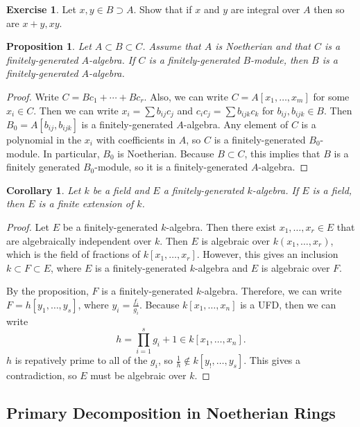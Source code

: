 \documentclass[leqno, openany]{memoir}
\newtheorem{cor}[thm]{Corollary}
\newtheorem{prop}[thm]{Proposition}
\theoremstyle{definition}
\newtheorem{exer}[thm]{Exercise}
\theoremstyle{remark}
\theoremstyle{plain}
\theoremstyle{definition}
\theoremstyle{remark}
\begin{document}
\begin{exer}
    Let $x,y \in B \supset A$. Show that if $x$ and $y$ are integral over $A$ then so are $x+y,xy$.
\end{exer}

\begin{prop}
    Let $A \subset B \subset C$. Assume that $A$ is Noetherian and that $C$ is a finitely-generated $A$-algebra. If $C$ is a finitely-generated $B$-module, then $B$ is a finitely-generated $A$-algebra.
\end{prop}

\begin{proof}
    Write $C = B c_1 + \cdots + B c_r$. Also, we can write $C = A[x_1, \ldots, x_m]$ for some $x_i \in C$. Then we can write $x_i = \sum b_{ij} c_j$ and $c_ic_j = \sum b_{ijk} c_k$ for $b_{ij}, b_{ijk} \in B$. Then $B_0 = A[b_{ij}, b_{ijk}]$ is a finitely-generated $A$-algebra. Any element of $C$ is a polynomial in the $x_i$ with coefficients in $A$, so $C$ is a finitely-generated $B_0$-module. In particular, $B_0$ is Noetherian. Because $B \subset C$, this implies that $B$ is a finitely generated $B_0$-module, so it is a finitely-generated $A$-algebra.
\end{proof}

\begin{cor}
    Let $k$ be a field and $E$ a finitely-generated $k$-algebra. If $E$ is a field, then $E$ is a finite extension of $k$.
\end{cor}

\begin{proof}
    Let $E$ be a finitely-generated $k$-algebra. Then there exist $x_1, \ldots, x_r \in E$ that are algebraically independent over $k$. Then $E$ is algebraic over $k(x_1, \ldots, x_r)$, which is the field of fractions of $k[x_1, \ldots, x_r]$. However, this gives an inclusion $k \subset F \subset E$, where $E$ is a finitely-generated $k$-algebra and $E$ is algebraic over $F$.

    By the proposition, $F$ is a finitely-generated $k$-algebra. Therefore, we can write $F = h[y_1, \ldots, y_s]$, where $y_i = \frac{f_i}{g_i}$. Because $k[x_1, \ldots, x_n]$ is a UFD, then we can write
    \[ h = \prod_{i=1}^s g_i + 1 \in k[x_1, \ldots, x_n]. \]
    $h$ is repatively prime to all of the $g_i$, so $\frac{1}{h} \notin k[y_!, \ldots, y_s]$. This gives a contradiction, so $E$ must be algebraic over $k$.
\end{proof}

\subsection{Primary Decomposition in Noetherian Rings}%
\label{sub:existence_of_}
\end{document}
